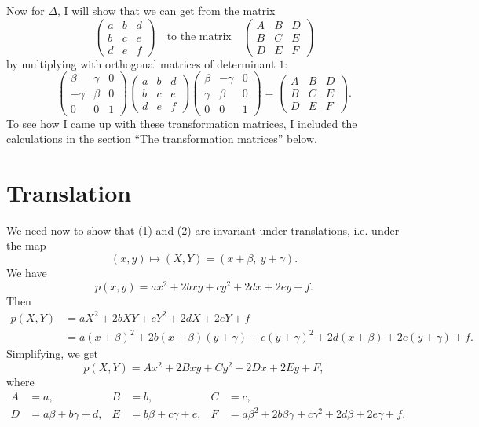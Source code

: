 Now for $\Delta$, I will show that we can get from the matrix
\[
\begin{pmatrix} a & b & d \\ b & c & e \\ d & e & f \end{pmatrix}
\quad\text{to the matrix}\quad
\begin{pmatrix} A & B & D \\ B & C & E \\ D & E & F \end{pmatrix}
\]
by multiplying with orthogonal matrices of determinant $1$:
\[
\begin{pmatrix} \beta & \gamma & 0 \\ -\gamma & \beta & 0 \\ 0 & 0 & 1 \end{pmatrix}
\begin{pmatrix} a & b & d \\ b & c & e \\ d & e & f \end{pmatrix}
\begin{pmatrix} \beta & -\gamma & 0 \\ \gamma & \beta & 0 \\ 0 & 0 & 1 \end{pmatrix}
= \begin{pmatrix} A & B & D \\ B & C & E \\ D & E & F \end{pmatrix}.
\]
To see how I came up with these transformation matrices, I included the calculations in the section ``The transformation matrices'' below.

\section{Translation}

We need now to show that (1) and (2) are invariant under translations, i.e. under the map
\[
(x,y) \mapsto (X,Y) = (x + \beta,\ y + \gamma).
\]
We have
\[
p(x,y) = ax^2 + 2bxy + cy^2 + 2dx + 2ey + f .
\]
Then
\[
\begin{aligned}
p(X,Y) &= aX^2 + 2bXY + cY^2 + 2dX + 2eY + f \\
&= a(x+\beta)^2 + 2b(x+\beta)(y+\gamma) + c(y+\gamma)^2 + 2d(x+\beta) + 2e(y+\gamma) + f .
\end{aligned}
\]
Simplifying, we get
\[
p(X,Y) = Ax^2 + 2Bxy + Cy^2 + 2Dx + 2Ey + F,
\]
where
\[
\begin{aligned}
A &= a, & B &= b, & C &= c, \\
D &= a\beta + b\gamma + d, & E &= b\beta + c\gamma + e, & F &= a\beta^2 + 2b\beta\gamma + c\gamma^2 + 2d\beta + 2e\gamma + f .
\end{aligned}
\]

